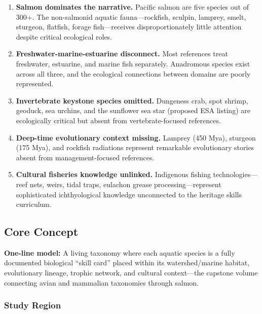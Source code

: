 \documentclass[11pt,letterpaper]{article}
\begin{document}
\begin{enumerate}[leftmargin=2em]
\item \textbf{Salmon dominates the narrative.} Pacific salmon are five species out of 300+. The non-salmonid aquatic fauna---rockfish, sculpin, lamprey, smelt, sturgeon, flatfish, forage fish---receives disproportionately little attention despite critical ecological roles.

\item \textbf{Freshwater-marine-estuarine disconnect.} Most references treat freshwater, estuarine, and marine fish separately. Anadromous species exist across all three, and the ecological connections between domains are poorly represented.

\item \textbf{Invertebrate keystone species omitted.} Dungeness crab, spot shrimp, geoduck, sea urchins, and the sunflower sea star (proposed ESA listing) are ecologically critical but absent from vertebrate-focused references.

\item \textbf{Deep-time evolutionary context missing.} Lamprey (450 Mya), sturgeon (175 Mya), and rockfish radiations represent remarkable evolutionary stories absent from management-focused references.

\item \textbf{Cultural fisheries knowledge unlinked.} Indigenous fishing technologies---reef nets, weirs, tidal traps, eulachon grease processing---represent sophisticated ichthyological knowledge unconnected to the heritage skills curriculum.
\end{enumerate}

\subsection{Core Concept}

\textbf{One-line model:} A living taxonomy where each aquatic species is a fully documented biological ``skill card'' placed within its watershed/marine habitat, evolutionary lineage, trophic network, and cultural context---the capstone volume connecting avian and mammalian taxonomies through salmon.

\subsubsection{Study Region}
\end{document}
